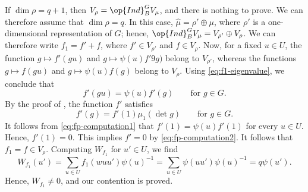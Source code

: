 \documentclass[../main.tex]{subfiles}
\begin{document}
If $\dim\rho=q+1$, then $V_\rho=\op{Ind}^G_BV_\mu$, and there is nothing to prove. We can therefore assume that $\dim\rho=q$. In this case, $\widehat\mu=\rho'\oplus\mu$, where $\rho'$ is a one-dimensional representation of $G$; hence, $\op{Ind}^G_BV_\mu=V_{\rho'}\oplus V_\rho$. We can therefore write $f_1=f'+f$, where $f'\in V_{\rho'}$ and $f\in V_\rho$. Now, for a fixed $u\in U$, the function $g\mapsto f'(gu)$ and $g\mapsto\psi(u)f'9g)$ belong to $V_{\rho'}$, whereas the functions $g\mapsto f(gu)$ and $g\mapsto\psi(u)f(g)$ belong to $V_\rho$. Using \eqref{eq:f1-eigenvalue}, we conclude that
\begin{equation}
	f'(gu)=\psi(u)f'(g)\qquad\text{for }g\in G. \label{eq:fp-computation1}
\end{equation}
By the proof of , the function $f'$ satisfies
\begin{equation}
	f'(g)=f'(1)\mu_1(\det g)\qquad\text{for }g\in G. \label{eq:fp-computation2}
\end{equation}
It follows from \eqref{eq:fp-computation1} that $f'(1)=\psi(u)f'(1)$ for every $u\in U$. Hence, $f'(1)=0$. This implies $f'=0$ by \eqref{eq:fp-computation2}. It follows that $f_1=f\in V_\rho$. Computing $W_{f_1}$ for $u'\in U$, we find
\[W_{f_1}(u')=\sum_{u\in U}f_1(wuu')\psi(u)^{-1}=\sum_{u\in U}\psi(uu')\psi(u)^{-1}=q\psi(u').\]
Hence, $W_{f_1}\ne0$, and our contention is proved.
\end{document}

